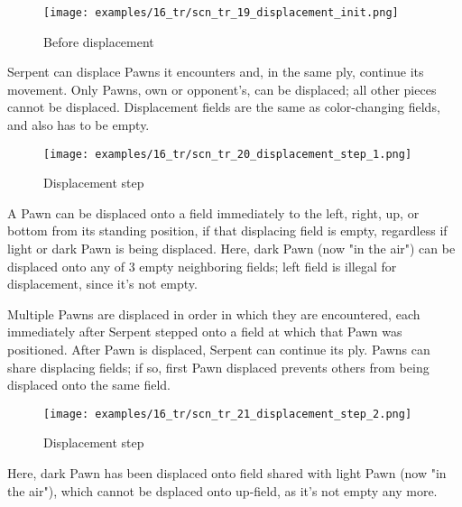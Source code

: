 \noindent
\begin{wrapfigure}[9]{l}{0.4\textwidth}
\centering
\texttt{[image: examples/16\_tr/scn\_tr\_19\_displacement\_init.png]}
\vspace*{-0.5\baselineskip}
\caption{Before displacement}
\label{fig:scn_tr_19_displacement_init}
\end{wrapfigure}
Serpent can displace Pawns it encounters and, in the same ply, continue its movement.
Only Pawns, own or opponent's, can be displaced; all other pieces cannot be displaced.\newline
\indent
Displacement fields are the same as color-changing fields, and also has to be empty.

\vspace*{1.3\baselineskip}
\noindent
\begin{wrapfigure}[11]{l}{0.4\textwidth}
\centering
\texttt{[image: examples/16\_tr/scn\_tr\_20\_displacement\_step\_1.png]}
\vspace*{-0.5\baselineskip}
\caption{Displacement step}
\label{fig:scn_tr_20_displacement_step_1}
\end{wrapfigure}
A Pawn can be displaced onto a field immediately to the left, right, up, or bottom
from its standing position, if that displacing field is empty, regardless if light
or dark Pawn is being displaced.\newline
\indent
Here, dark Pawn (now "in the air") can be displaced onto any of 3 empty neighboring
fields; left field is illegal for displacement, since it's not empty.

\vspace*{-0.8\baselineskip}
\mbox{}\newline %
Multiple Pawns are displaced in order in which they are encountered, each immediately
after Serpent stepped onto a field at which that Pawn was positioned. After Pawn is
displaced, Serpent can continue its ply. Pawns can share displacing fields; if so,
first Pawn displaced prevents others from being displaced onto the same field.

\clearpage %

\noindent
\begin{wrapfigure}[5]{l}{0.4\textwidth}
\centering
\texttt{[image: examples/16\_tr/scn\_tr\_21\_displacement\_step\_2.png]}
\vspace*{-0.5\baselineskip}
\caption{Displacement step}
\label{fig:scn_tr_21_displacement_step_2}
\end{wrapfigure}
Here, dark Pawn has been displaced onto field shared with light Pawn (now "in the air"),
which cannot be dsplaced onto up-field, as it's not empty any more.

